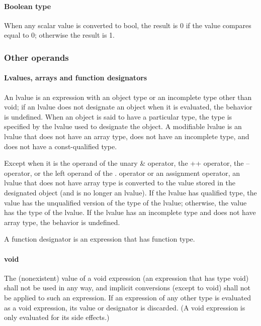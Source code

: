 \documentclass{article}
\begin{document}
\paragraph*{Boolean type}
When any scalar value is converted to bool, the result is 0 if the value compares equal 
to 0; otherwise the result is 1.

\subsubsection{Other operands}
\paragraph{Lvalues, arrays and function designators}
An lvalue is an expression with an object type or an incomplete type other than void; 
if an lvalue does not designate an object when it is evaluated, the behavior is undefined.
When an object is said to have a particular type, the type is specified by the lvalue 
used to designate the object.  A modifiable lvalue is an lvalue that does not have an 
array type, does not have an incomplete type, and does not have a const-qualified type.
\linebreak

Except when it is the operand of the unary \& operator, the ++ operator, the -- operator,
or the left operand of the . operator or an assignment operator, an lvalue that does not 
have array type is converted to the value stored in the designated object (and is no 
longer an lvalue).  If the lvalue has qualified type, the value has the unqualified 
version of the type of the lvalue; otherwise, the value has the type of the lvalue. If 
the lvalue has an incomplete type and does not have array type, the behavior is undefined.
\linebreak

A function designator is an expression that has function type.

\paragraph*{void}
The (nonexistent) value of a void expression (an expression that has type void) shall not 
be used in any way, and implicit conversions (except to void) shall not be applied to 
such an expression.  If an expression of any other type is evaluated as a void expression,
its value or designator is discarded. (A void expression is only evaluated for its 
side effects.)
\pagebreak
\end{document}
